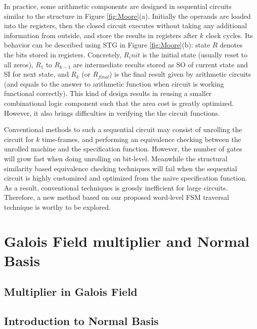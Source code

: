 In practice,
some arithmetic components are designed in sequential circuits similar to the structure in 
Figure \ref{fig:Moore}(a). Initially the operands are loaded into the registers, 
then the closed circuit executes without taking any additional information from outside,
and store the results in registers after $k$ clock cycles. Its behavior can be described using
STG in Figure \ref{fig:Moore}(b): state $R$ denotes the bits stored in registers. Concretely, $R_init$ is the initial
state (usually reset to all zeros), $R_1$ to $R_{k-1}$ are intermediate results stored as SO of current state and SI
for next state, and $R_k$ (or $R_{final}$) is the final result given by arithmetic circuits (and equals to the answer
to arithmetic function when circuit is working functional correctly).
This kind of design results in 
reusing a smaller combinational logic component such that the area cost is greatly optimized.
However, it also brings difficulties in verifying the the circuit functions.

\begin{figure}[H]
\end{figure}

Conventional methods to such a sequential circuit may consist of unrolling the circuit for 
$k$ time-frames, and performing an equivalence checking between the unrolled machine and
the specification function. However, the number of gates will grow fast when doing unrolling
on bit-level. Meanwhile the structural similarity based equivalence checking techniques 
will fail when the sequential circuit is highly customized and optimized from the naive specification 
function. As a result, conventional techniques is grossly inefficient for large circuits.
Therefore, a new method based on our proposed word-level FSM traversal technique is worthy to be explored.

\section{Galois Field multiplier and Normal Basis}
\subsection{Multiplier in Galois Field}

\subsection{Introduction to Normal Basis}
